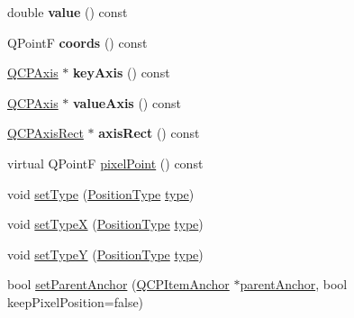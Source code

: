 \begin{DoxyCompactItemize}
double {\bfseries value} () const
\item 
\mbox{\label{class_q_c_p_item_position_aa4ecf5b04c67049c05d37619e090820b}} 
Q\+PointF {\bfseries coords} () const
\item 
\mbox{\label{class_q_c_p_item_position_a9ad34861fbfd8be8b8270c16f879169c}} 
\mbox{\hyperlink{class_q_c_p_axis}{Q\+C\+P\+Axis}} $\ast$ {\bfseries key\+Axis} () const
\item 
\mbox{\label{class_q_c_p_item_position_a356ac94e7e73d88deb7f2841c0d0c734}} 
\mbox{\hyperlink{class_q_c_p_axis}{Q\+C\+P\+Axis}} $\ast$ {\bfseries value\+Axis} () const
\item 
\mbox{\label{class_q_c_p_item_position_ae4081cfe7575f922f403c6e3a2ce7891}} 
\mbox{\hyperlink{class_q_c_p_axis_rect}{Q\+C\+P\+Axis\+Rect}} $\ast$ {\bfseries axis\+Rect} () const
\item 
virtual Q\+PointF \mbox{\hyperlink{class_q_c_p_item_position_a6cad070c22801295231f5bd6045afe70}{pixel\+Point}} () const
\item 
void \mbox{\hyperlink{class_q_c_p_item_position_aa476abf71ed8fa4c537457ebb1a754ad}{set\+Type}} (\mbox{\hyperlink{class_q_c_p_item_position_aad9936c22bf43e3d358552f6e86dbdc8}{Position\+Type}} \mbox{\hyperlink{class_q_c_p_item_position_abfd74d86bd799306ce0295ffe433bdfc}{type}})
\item 
void \mbox{\hyperlink{class_q_c_p_item_position_a2113b2351d6d00457fb3559a4e20c3ea}{set\+TypeX}} (\mbox{\hyperlink{class_q_c_p_item_position_aad9936c22bf43e3d358552f6e86dbdc8}{Position\+Type}} \mbox{\hyperlink{class_q_c_p_item_position_abfd74d86bd799306ce0295ffe433bdfc}{type}})
\item 
void \mbox{\hyperlink{class_q_c_p_item_position_ac2a454aa5a54c1615c50686601ec4510}{set\+TypeY}} (\mbox{\hyperlink{class_q_c_p_item_position_aad9936c22bf43e3d358552f6e86dbdc8}{Position\+Type}} \mbox{\hyperlink{class_q_c_p_item_position_abfd74d86bd799306ce0295ffe433bdfc}{type}})
\item 
bool \mbox{\hyperlink{class_q_c_p_item_position_ac094d67a95d2dceafa0d50b9db3a7e51}{set\+Parent\+Anchor}} (\mbox{\hyperlink{class_q_c_p_item_anchor}{Q\+C\+P\+Item\+Anchor}} $\ast$\mbox{\hyperlink{class_q_c_p_item_position_a0a87f9dce1af6cc9b510785991bcf1c6}{parent\+Anchor}}, bool keep\+Pixel\+Position=false)

\end{DoxyCompactItemize}
